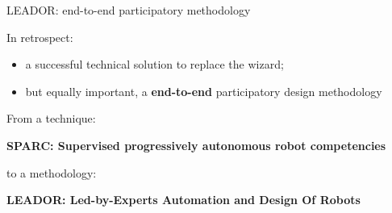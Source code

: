 \documentclass[xcolor=table]{beamer}
\begin{document}
{
\begin{frame}{LEADOR: end-to-end participatory methodology}

    In retrospect:

    \begin{itemize}
        \item a successful technical solution to replace the wizard;
        \item but equally important, a \textbf{end-to-end} participatory design
            methodology
    \end{itemize}

    \pause

        From a technique:
        \begin{center}
        \textbf{SPARC: Supervised progressively autonomous robot
        competencies}
        \end{center}

        to a methodology: 
        \begin{center}
        \textbf{LEADOR: Led-by-Experts Automation and Design Of Robots}
        \end{center}


\end{frame}
}
\end{document}
